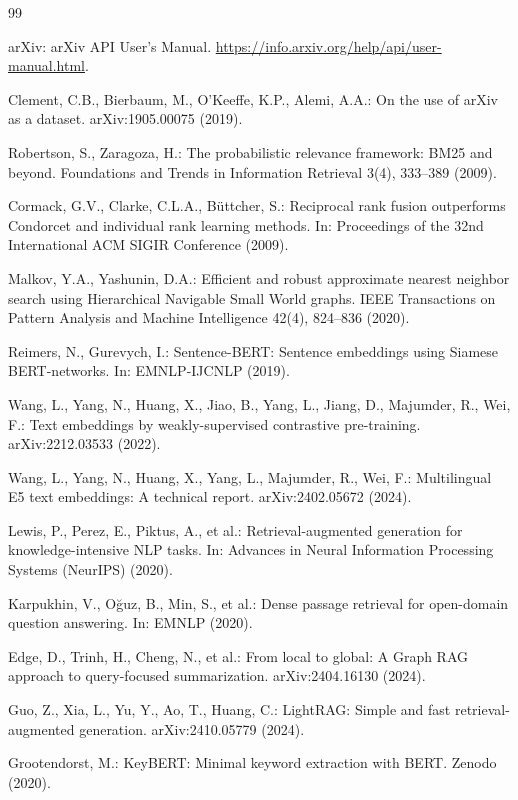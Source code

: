 \begin{thebibliography}{99}

arXiv: arXiv API User's Manual. \url{https://info.arxiv.org/help/api/user-manual.html}.

Clement, C.B., Bierbaum, M., O'Keeffe, K.P., Alemi, A.A.: On the use of arXiv as a dataset. arXiv:1905.00075
(2019).

Robertson, S., Zaragoza, H.: The probabilistic relevance framework: BM25 and beyond. Foundations and Trends in
Information Retrieval 3(4), 333--389 (2009).

Cormack, G.V., Clarke, C.L.A., Büttcher, S.: Reciprocal rank fusion outperforms Condorcet and individual rank
learning methods. In: Proceedings of the 32nd International ACM SIGIR Conference (2009).

Malkov, Y.A., Yashunin, D.A.: Efficient and robust approximate nearest neighbor search using Hierarchical
Navigable Small World graphs. IEEE Transactions on Pattern Analysis and Machine Intelligence 42(4), 824--836
(2020).

Reimers, N., Gurevych, I.: Sentence-BERT: Sentence embeddings using Siamese BERT-networks. In: EMNLP-IJCNLP
(2019).

Wang, L., Yang, N., Huang, X., Jiao, B., Yang, L., Jiang, D., Majumder, R., Wei, F.: Text embeddings by
weakly-supervised contrastive pre-training. arXiv:2212.03533 (2022).

Wang, L., Yang, N., Huang, X., Yang, L., Majumder, R., Wei, F.: Multilingual E5 text embeddings: A technical
report. arXiv:2402.05672 (2024).

Lewis, P., Perez, E., Piktus, A., et al.: Retrieval-augmented generation for knowledge-intensive NLP tasks. In:
Advances in Neural Information Processing Systems (NeurIPS) (2020).

Karpukhin, V., Oğuz, B., Min, S., et al.: Dense passage retrieval for open-domain question answering. In: EMNLP
(2020).

Edge, D., Trinh, H., Cheng, N., et al.: From local to global: A Graph RAG approach to query-focused
summarization. arXiv:2404.16130 (2024).

Guo, Z., Xia, L., Yu, Y., Ao, T., Huang, C.: LightRAG: Simple and fast retrieval-augmented generation.
arXiv:2410.05779 (2024).

Grootendorst, M.: KeyBERT: Minimal keyword extraction with BERT. Zenodo (2020).


\end{thebibliography}
